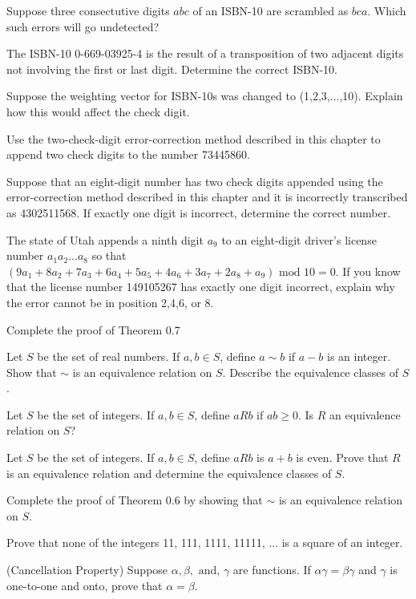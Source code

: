\documentclass[11pt,largemargins]{homework}
\begin{document}
\question 
Suppose three consectutive digits $abc$ of an ISBN-10 are scrambled as $bca$. Which such errors will go undetected?

\question 
The ISBN-10 0-669-03925-4 is the result of a transposition of two adjacent digits not involving the first or last digit. 
Determine the correct ISBN-10.

\question 
Suppose the weighting vector for ISBN-10s was changed to (1,2,3,...,10). Explain how this would affect the check digit.

\question 
Use the two-check-digit error-correction method described in this chapter to append two check digits to the 
number 73445860.

\question 
Suppose that an eight-digit number has two check digits appended using the error-correction method described in this chapter 
and it is incorrectly transcribed as 4302511568. If exactly one digit is incorrect, determine the correct number.

\question 
The state of Utah appends a ninth digit $a_9$ to an eight-digit driver's license number $a_1a_2...a_8$ so that 
$(9a_1+8a_2+7a_3+6a_4+5a_5+4a_6+3a_7+2a_8+a_9)\text{ mod } 10 =0$. If you know that the license number 149105267 has 
exactly one digit incorrect, explain why the error cannot be in position 2,4,6, or 8.

\question 
Complete the proof of Theorem 0.7

\question 
Let $S$ be the set of real numbers. If $a,b \in S$, define $a\sim b$ if $a-b$ is an integer. Show that $\sim$ is an 
equivalence relation on $S$. Describe the equivalence classes of $S$.

\question 
Let $S$ be the set of integers. If $a,b \in S$, define $aRb$ if $ab\geq 0$. Is $R$ an equivalence relation on $S$?

\question 
Let $S$ be the set of integers. If $a,b \in S$, define $aRb$ is $a+b$ is even. Prove that $R$ is an equivalence relation 
and determine the equivalence classes of $S$.

\question
Complete the proof of Theorem 0.6 by showing that $\sim$ is an equivalence relation on $S$.

\question 
Prove that none of the integers 11, 111, 1111, 11111, ... is a square of an integer.

\question 
(Cancellation Property) Suppose $\alpha, \beta, \text{ and, } \gamma$ are functions. If $\alpha\gamma=\beta\gamma$ and $\gamma$ 
is one-to-one and onto, prove that $\alpha=\beta$.
\end{document}
